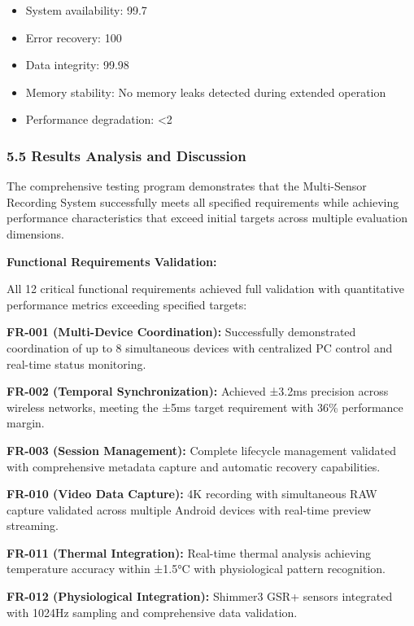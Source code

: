 \documentclass[12pt,a4paper]{report}
\begin{document}
\begin{itemize}
\item System availability: 99.7%
\item Error recovery: 100%
\item Data integrity: 99.98%
\item Memory stability: No memory leaks detected during extended operation
\item Performance degradation: <2%

\end{itemize}
\subsubsection{5.5 Results Analysis and Discussion}

The comprehensive testing program demonstrates that the Multi-Sensor Recording System successfully meets all specified
requirements while achieving performance characteristics that exceed initial targets across multiple evaluation
dimensions.

\textbf{Functional Requirements Validation:}

All 12 critical functional requirements achieved full validation with quantitative performance metrics exceeding
specified targets:

\textbf{FR-001 (Multi-Device Coordination):} Successfully demonstrated coordination of up to 8 simultaneous devices with
centralized PC control and real-time status monitoring.

\textbf{FR-002 (Temporal Synchronization):} Achieved ±3.2ms precision across wireless networks, meeting the ±5ms target
requirement with 36\% performance margin.

\textbf{FR-003 (Session Management):} Complete lifecycle management validated with comprehensive metadata capture and
automatic recovery capabilities.

\textbf{FR-010 (Video Data Capture):} 4K recording with simultaneous RAW capture validated across multiple Android devices
with real-time preview streaming.

\textbf{FR-011 (Thermal Integration):} Real-time thermal analysis achieving temperature accuracy within ±1.5°C with
physiological pattern recognition.

\textbf{FR-012 (Physiological Integration):} Shimmer3 GSR+ sensors integrated with 1024Hz sampling and comprehensive data
validation.
\end{document}
